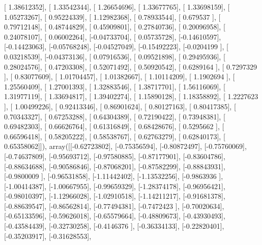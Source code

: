 \documentclass{article}
\begin{document}
       [ 1.38612352],
       [ 1.33542344],
       [ 1.26654696],
       [ 1.33677765],
       [ 1.33698159],
       [ 1.05273267],
       [ 0.95224339],
       [ 1.12982368],
       [ 0.78933544],
       [ 0.679537  ],
       [ 0.79712148],
       [ 0.48744829],
       [ 0.45909801],
       [ 0.27840736],
       [ 0.20096958],
       [ 0.24078107],
       [ 0.06002264],
       [-0.04733704],
       [ 0.05735728],
       [-0.14610597],
       [-0.14423063],
       [-0.05768248],
       [-0.04527049],
       [-0.15492223],
       [-0.0204199 ],
       [ 0.03218539],
       [-0.04373136],
       [ 0.07916536],
       [ 0.09521898],
       [ 0.29495936],
       [ 0.28024576],
       [ 0.47203308],
       [ 0.52071492],
       [ 0.50920542],
       [ 0.6289164 ],
       [ 0.7297329 ],
       [ 0.83077609],
       [ 1.01704457],
       [ 1.01382667],
       [ 1.10114209],
       [ 1.1902694 ],
       [ 1.25560409],
       [ 1.27001393],
       [ 1.32883546],
       [ 1.38717701],
       [ 1.56116069],
       [ 1.31977119],
       [ 1.33694817],
       [ 1.39402274],
       [ 1.15890128],
       [ 1.18358892],
       [ 1.2227623 ],
       [ 1.00499226],
       [ 0.92413346],
       [ 0.86901624],
       [ 0.80127163],
       [ 0.80417385],
       [ 0.70343327],
       [ 0.67253288],
       [ 0.64304389],
       [ 0.72190422],
       [ 0.73948381],
       [ 0.69482303],
       [ 0.66626764],
       [ 0.61316849],
       [ 0.68428676],
       [ 0.5295662 ],
       [ 0.66596418],
       [ 0.58205222],
       [ 0.58538767],
       [ 0.62763279],
       [ 0.62840173],
       [ 0.65358062]]), array([[-0.62723802],
       [-0.75356594],
       [-0.80872497],
       [-0.75760069],
       [-0.74637809],
       [-0.95693712],
       [-0.97580885],
       [-0.87177901],
       [-0.83604786],
       [-0.88634688],
       [-0.90586846],
       [-0.87068201],
       [-0.87582299],
       [-0.88843931],
       [-0.9800009 ],
       [-0.96531858],
       [-1.11442402],
       [-1.13532256],
       [-0.9863936 ],
       [-1.00414387],
       [-1.00667955],
       [-0.99659329],
       [-1.28374178],
       [-0.96956421],
       [-0.98010397],
       [-1.12966028],
       [-1.02910518],
       [-1.14211217],
       [-0.91681378],
       [-0.88639547],
       [-0.86562814],
       [-0.77494381],
       [-0.7472423 ],
       [-0.70020634],
       [-0.65133596],
       [-0.59626018],
       [-0.65579664],
       [-0.48809673],
       [-0.43930493],
       [-0.43584439],
       [-0.32730258],
       [-0.4146376 ],
       [-0.36334133],
       [-0.22820401],
       [-0.35203917],
       [-0.31628553],
\end{document}
